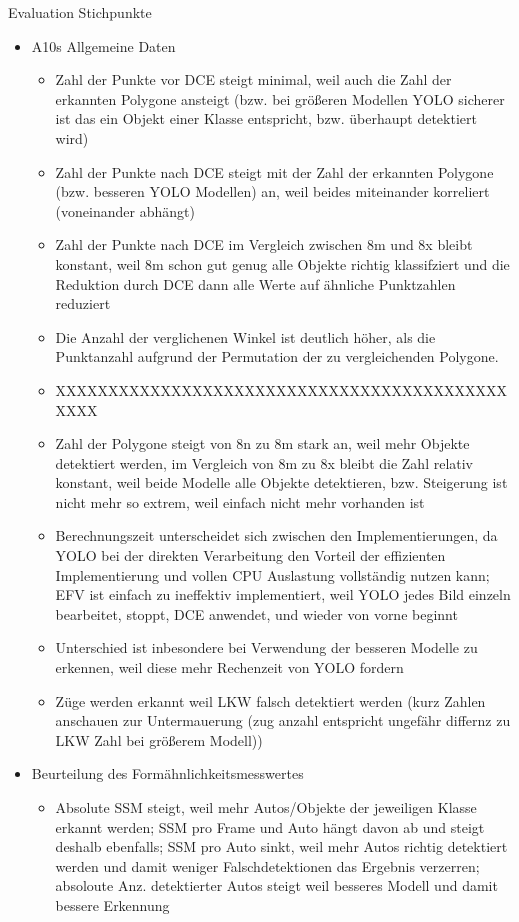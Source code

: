 {	Evaluation Stichpunkte
	\begin{itemize}
		\item A10s Allgemeine Daten
		\begin{itemize}
			\item Zahl der Punkte vor DCE steigt minimal, weil auch die Zahl der erkannten Polygone ansteigt (bzw. bei größeren Modellen YOLO sicherer ist das ein Objekt einer Klasse entspricht, bzw. überhaupt detektiert wird)
			\item Zahl der Punkte nach DCE steigt mit der Zahl der erkannten Polygone (bzw. besseren YOLO Modellen) an, weil beides miteinander korreliert (voneinander abhängt)
			\item Zahl der Punkte nach DCE im Vergleich zwischen 8m und 8x bleibt konstant, weil 8m schon gut genug alle Objekte richtig klassifziert und die Reduktion durch DCE dann alle Werte auf ähnliche Punktzahlen reduziert
			\item Die Anzahl der verglichenen Winkel ist deutlich höher, als die Punktanzahl aufgrund der Permutation der zu vergleichenden Polygone.
			\item XXXXXXXXXXXXXXXXXXXXXXXXXXXXXXXXXXXXXXXXXXXXXXX
			\item Zahl der Polygone steigt von 8n zu 8m stark an, weil mehr Objekte detektiert werden, im Vergleich von 8m zu 8x bleibt die Zahl relativ konstant, weil beide Modelle alle Objekte detektieren, bzw. Steigerung ist nicht mehr so extrem, weil einfach nicht mehr vorhanden ist
			\item Berechnungszeit unterscheidet sich zwischen den Implementierungen, da YOLO bei der direkten Verarbeitung den Vorteil der effizienten Implementierung und vollen CPU Auslastung vollständig nutzen kann; EFV ist einfach zu ineffektiv implementiert, weil YOLO jedes Bild einzeln bearbeitet, stoppt, DCE anwendet, und wieder von vorne beginnt 
			\item Unterschied ist inbesondere bei Verwendung der besseren Modelle zu erkennen, weil diese mehr Rechenzeit von YOLO fordern
			\item Züge werden erkannt weil LKW falsch detektiert werden (kurz Zahlen anschauen zur Untermauerung (zug anzahl entspricht ungefähr differnz zu LKW Zahl bei größerem Modell))
		\end{itemize}
		\item Beurteilung des Formähnlichkeitsmesswertes
		\begin{itemize}
			\item Absolute SSM steigt, weil mehr Autos/Objekte der jeweiligen Klasse erkannt werden; SSM pro Frame und Auto hängt davon ab und steigt deshalb ebenfalls; SSM pro Auto sinkt, weil mehr Autos richtig detektiert werden und damit weniger Falschdetektionen das Ergebnis verzerren; absoloute Anz. detektierter Autos steigt weil besseres Modell und damit bessere Erkennung

\end{itemize}
\end{itemize}}
